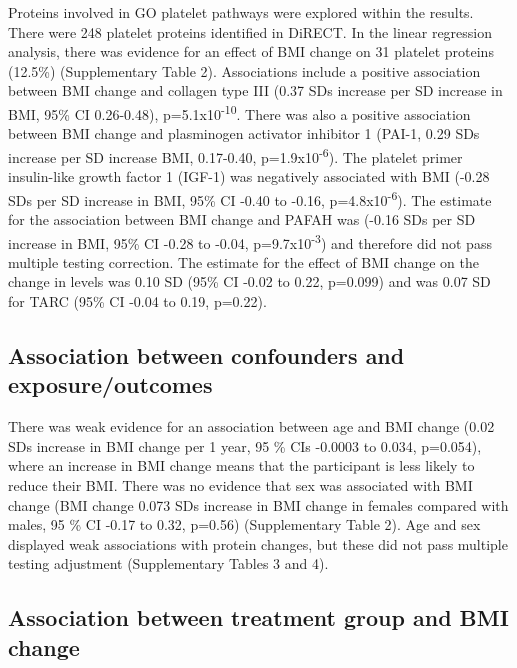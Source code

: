 \documentclass[11pt,twoside]{bristolthesis}
\begin{document}
Proteins involved in GO platelet pathways were explored within the results. There were 248 platelet proteins identified in DiRECT. In the linear regression analysis, there was evidence for an effect of BMI change on 31 platelet proteins (12.5\%) (Supplementary Table 2). Associations include a positive association between BMI change and collagen type III (0.37 SDs increase per SD increase in BMI, 95\% CI 0.26-0.48), p=5.1x10\textsuperscript{-10}. There was also a positive association between BMI change and plasminogen activator inhibitor 1 (PAI-1, 0.29 SDs increase per SD increase BMI, 0.17-0.40, p=1.9x10\textsuperscript{-6}). The platelet primer insulin-like growth factor 1 (IGF-1) was negatively associated with BMI (-0.28 SDs per SD increase in BMI, 95\% CI -0.40 to -0.16, p=4.8x10\textsuperscript{-6}). The estimate for the association between BMI change and PAFAH was (-0.16 SDs per SD increase in BMI, 95\% CI -0.28 to -0.04, p=9.7x10\textsuperscript{-3}) and therefore did not pass multiple testing correction. The estimate for the effect of BMI change on the change in levels was 0.10 SD (95\% CI -0.02 to 0.22, p=0.099) and was 0.07 SD for TARC (95\% CI -0.04 to 0.19, p=0.22).

\hypertarget{association-between-confounders-and-exposureoutcomes}{%
\subsection{Association between confounders and exposure/outcomes}\label{association-between-confounders-and-exposureoutcomes}}

There was weak evidence for an association between age and BMI change (0.02 SDs increase in BMI change per 1 year, 95 \% CIs -0.0003 to 0.034, p=0.054), where an increase in BMI change means that the participant is less likely to reduce their BMI. There was no evidence that sex was associated with BMI change (BMI change 0.073 SDs increase in BMI change in females compared with males, 95 \% CI -0.17 to 0.32, p=0.56) (Supplementary Table 2). Age and sex displayed weak associations with protein changes, but these did not pass multiple testing adjustment (Supplementary Tables 3 and 4).

\hypertarget{association-between-treatment-group-and-bmi-change}{%
\subsection{Association between treatment group and BMI change}\label{association-between-treatment-group-and-bmi-change}}
\end{document}
